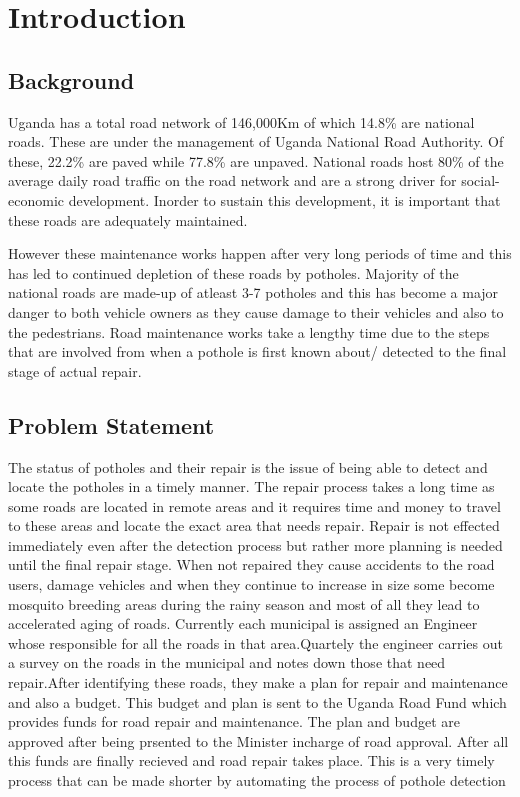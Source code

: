 \documentclass[12pt]{report}
\begin{document}
\chapter{Introduction}

\section{Background}

Uganda has a total road network of 146,000Km of which 14.8\%  are national roads. These are under the management of Uganda National Road Authority. Of these, 22.2\% are paved while 77.8\% are unpaved. National roads host 80\% of the average daily road traffic on the road network and are a strong driver for social-economic development. Inorder to sustain this development, it is important that these roads are adequately maintained\cite{Roads}.

However these maintenance works happen after very long periods of time and this has led to continued depletion of these roads by potholes. Majority of the national roads are made-up of atleast 3-7 potholes and this has become a major danger to both vehicle owners as they cause damage to their vehicles and also to the pedestrians. Road maintenance works take a lengthy time due to the steps that are involved from when a pothole is first known about/ detected to the final stage of actual repair.




\section{Problem Statement}

The status of potholes and their repair is the issue of being able to detect and locate the potholes in a timely manner. The repair process takes a long time as some roads are located in remote areas and it requires time and money to travel to these areas and locate the exact area that needs repair. Repair is not effected immediately even after the detection process but rather more planning is needed until the final repair stage. When not repaired they cause accidents to the road users, damage vehicles and when they continue to increase in size some become mosquito breeding areas during the rainy season and most of all they lead to accelerated aging of roads. 
Currently each municipal is assigned an Engineer whose responsible for all the roads in that area.Quartely the engineer carries  out a survey on the roads in the municipal and notes down those that need repair.After identifying these roads, they make a plan for repair and maintenance and also a budget. This budget and plan is sent to the Uganda Road Fund which provides funds for road repair and maintenance. The plan and budget are approved after being prsented to the Minister incharge of road approval. After all this funds are finally recieved and road repair takes place. This is a very timely process that can be made shorter by automating the process of pothole detection\cite{Road--Fund}
\end{document}
